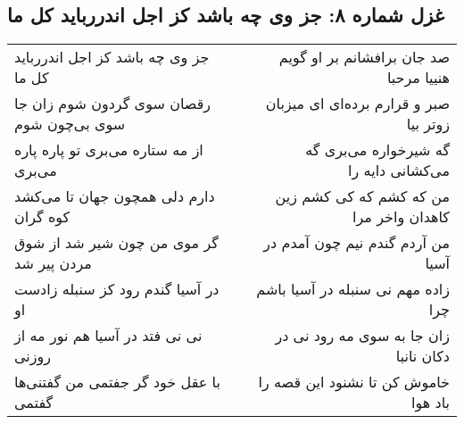\begin{center}
\section*{غزل شماره ۸: جز وی چه باشد کز اجل اندررباید کل ما}
\label{sec:0008}
\begin{longtable}{l p{0.5cm} r}
جز وی چه باشد کز اجل اندررباید کل ما
&&
صد جان برافشانم بر او گویم هنییا مرحبا
\\
رقصان سوی گردون شوم زان جا سوی بی‌چون شوم
&&
صبر و قرارم برده‌ای ای میزبان زوتر بیا
\\
از مه ستاره می‌بری تو پاره پاره می‌بری
&&
گه شیرخواره می‌بری گه می‌کشانی دایه را
\\
دارم دلی همچون جهان تا می‌کشد کوه گران
&&
من که کشم که کی کشم زین کاهدان واخر مرا
\\
گر موی من چون شیر شد از شوق مردن پیر شد
&&
من آردم گندم نیم چون آمدم در آسیا
\\
در آسیا گندم رود کز سنبله زادست او
&&
زاده مهم نی سنبله در آسیا باشم چرا
\\
نی نی فتد در آسیا هم نور مه از روزنی
&&
زان جا به سوی مه رود نی در دکان نانبا
\\
با عقل خود گر جفتمی من گفتنی‌ها گفتمی
&&
خاموش کن تا نشنود این قصه را باد هوا
\\
\end{longtable}
\end{center}
